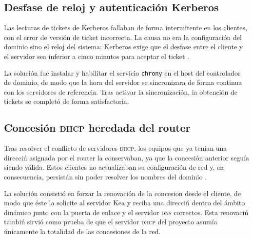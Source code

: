 \subsection{Desfase de reloj y autenticaci\'on Kerberos}

Las lecturas de tickets de Kerberos fallaban de forma intermitente en los
clientes, con el error de versi\'on de ticket incorrecta. La causa no era la
configuraci\'on del dominio sino el reloj del sistema: Kerberos exige que
el desfase entre el cliente y el servidor sea inferior a cinco minutos
para aceptar el ticket \cite{rfc4120}.

La soluci\'on fue instalar y habilitar el servicio \texttt{chrony} en el
host del controlador de dominio, de modo que la hora del servidor se
sincronizara de forma continua con los servidores de referencia. Tras
activar la sincronizaci\'on, la obtenci\'on de tickets se complet\'o de
forma satisfactoria.


\subsection{Concesi\'on \textsc{dhcp} heredada del router}

Tras resolver el conflicto de servidores \textsc{dhcp}, los equipos que ya
ten\'ian una direcci\'n asignada por el router la conservaban, ya que la
concesi\'on anterior segu\'ia siendo v\'alida. Estos clientes no
actualizaban su configuraci\'on de red y, en consecuencia, persist\'an sin
poder resolver los nombres del dominio \cite{droms1997}.

La soluci\'on consisti\'o en forzar la renovaci\'on de la concesion desde
el cliente, de modo que \'este la solicite al servidor Kea y reciba una
direcci\'n dentro del \'ambito din\'amico junto con la puerta de enlace y el
servidor \textsc{dns} correctos. Esta renovaci\'n tambi\'n sirvi\'o como
prueba de que el servidor \textsc{dhcp} del proyecto asum\'ia \'unicamente
la totalidad de las concesiones de la red.



